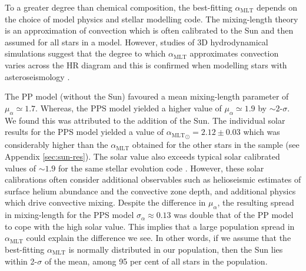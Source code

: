 \documentclass[a4paper,fleqn,usenatbib]{mnras}
\newcommand{\mlt}{\ensuremath{{\alpha_\mathrm{MLT}}}}
\begin{document}
To a greater degree than chemical composition, the best-fitting $\mlt$ depends on the choice of model physics and stellar modelling code. The mixing-length theory is an approximation of convection which is often calibrated to the Sun and then assumed for all stars in a model. However, studies of 3D hydrodynamical simulations suggest that the degree to which $\mlt$ approximates convection varies across the HR diagram \citep{Magic.Weiss.ea2015} and this is confirmed when modelling stars with asteroseismology \citep{Tayar.Somers.ea2017}.


The PP model (without the Sun) favoured a mean mixing-length parameter of $\mu_\alpha \simeq 1.7$. Whereas, the PPS model yielded a higher value of $\mu_\alpha \simeq 1.9$ by $\sim 2$-$\sigma$. We found this was attributed to the addition of the Sun. The individual solar results for the PPS model yielded a value of $\mlt_\odot = 2.12\pm0.03$ which was considerably higher than the $\mlt$ obtained for the other stars in the sample (see Appendix \ref{sec:sun-res}). The solar value also exceeds typical solar calibrated values of $\sim 1.9$ for the same stellar evolution code \citep[see e.g.][]{Stancliffe.Fossati.ea2016}. However, these solar calibrations often consider additional observables such as helioseismic estimates of surface helium abundance and the convective zone depth, and additional physics which drive convective mixing.
Despite the difference in $\mu_\alpha$, the resulting spread in mixing-length for the PPS model $\sigma_\alpha \approx 0.13$ was double that of the PP model to cope with the high solar value. This implies that a large population spread in $\mlt$ could explain the difference we see. In other words, if we assume that the best-fitting $\mlt$ is normally distributed in our population, then the Sun lies within 2-$\sigma$ of the mean, among 95 per cent of all stars in the population. 
\end{document}
